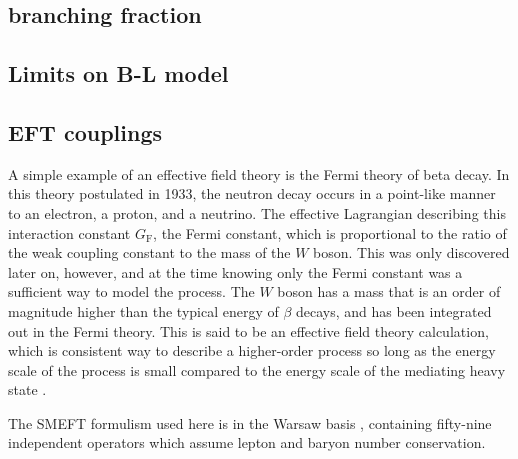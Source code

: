 \subsection{\ZFourL branching fraction}

\subsection{Limits on B-L model}

\subsection{EFT couplings}

A simple example of an effective field theory is the Fermi theory of beta decay. In this theory postulated in 1933, the neutron decay occurs in a point-like manner to an electron, a proton, and a neutrino. The effective Lagrangian describing this interaction constant $G_{\text{F}}$, the Fermi constant, which is proportional to the ratio of the weak coupling constant to the mass of the $W$ boson. This was only discovered later on, however, and at the time knowing only the Fermi constant was a sufficient way to model the process. The $W$ boson has a mass that is an order of magnitude higher than the typical energy of $\beta$ decays, and has been integrated out in the Fermi theory. This is said to be an effective field theory calculation, which is consistent way to describe a higher-order process so long as the energy scale of the process is small compared to the energy scale of the mediating heavy state \cite{De_Simone_2016}. 

The SMEFT formulism used here is in the Warsaw basis , containing fifty-nine independent operators which assume lepton and baryon number conservation. 
